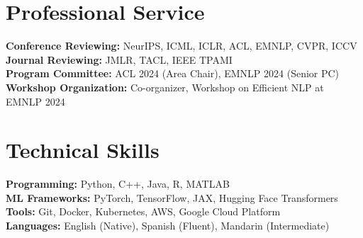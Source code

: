 \documentclass[11pt]{article}
\begin{document}
\section*{Professional Service}

\textbf{Conference Reviewing:} NeurIPS, ICML, ICLR, ACL, EMNLP, CVPR, ICCV \\
\textbf{Journal Reviewing:} JMLR, TACL, IEEE TPAMI \\
\textbf{Program Committee:} ACL 2024 (Area Chair), EMNLP 2024 (Senior PC) \\
\textbf{Workshop Organization:} Co-organizer, Workshop on Efficient NLP at EMNLP 2024

\vspace{0.2cm}

\section*{Technical Skills}

\textbf{Programming:} Python, C++, Java, R, MATLAB \\
\textbf{ML Frameworks:} PyTorch, TensorFlow, JAX, Hugging Face Transformers \\
\textbf{Tools:} Git, Docker, Kubernetes, AWS, Google Cloud Platform \\
\textbf{Languages:} English (Native), Spanish (Fluent), Mandarin (Intermediate)
\end{document}
